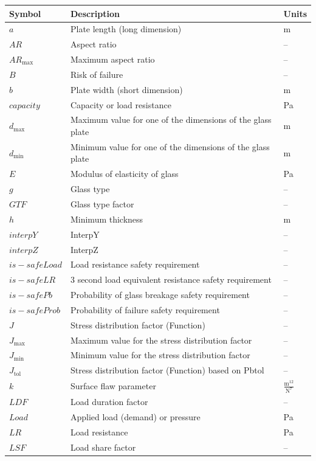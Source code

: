 \documentclass[12pt]{article}
\begin{document}
\begin{longtabu}{l X[l] l}
\toprule
\textbf{Symbol} & \textbf{Description} & \textbf{Units}
\\
\midrule
\endhead
$a$ & Plate length (long dimension) & m
\\
$AR$ & Aspect ratio & --
\\
${AR_{\text{max}}}$ & Maximum aspect ratio & --
\\
$B$ & Risk of failure & --
\\
$b$ & Plate width (short dimension) & m
\\
$capacity$ & Capacity or load resistance & Pa
\\
${d_{\text{max}}}$ & Maximum value for one of the dimensions of the glass plate & m
\\
${d_{\text{min}}}$ & Minimum value for one of the dimensions of the glass plate & m
\\
$E$ & Modulus of elasticity of glass & Pa
\\
$g$ & Glass type & --
\\
$GTF$ & Glass type factor & --
\\
$h$ & Minimum thickness & m
\\
$interpY$ & InterpY & --
\\
$interpZ$ & InterpZ & --
\\
$is-safeLoad$ & Load resistance safety requirement & --
\\
$is-safeLR$ & 3 second load equivalent resistance safety requirement & --
\\
$is-safePb$ & Probability of glass breakage safety requirement & --
\\
$is-safeProb$ & Probability of failure safety requirement & --
\\
$J$ & Stress distribution factor (Function) & --
\\
${J_{\text{max}}}$ & Maximum value for the stress distribution factor & --
\\
${J_{\text{min}}}$ & Minimum value for the stress distribution factor & --
\\
${J_{\text{tol}}}$ & Stress distribution factor (Function) based on Pbtol & --
\\
$k$ & Surface flaw parameter & $\frac{\text{m}^{12}}{\text{N}^{7}}$
\\
$LDF$ & Load duration factor & --
\\
$Load$ & Applied load (demand) or pressure & Pa
\\
$LR$ & Load resistance & Pa
\\
$LSF$ & Load share factor & --

\end{longtabu}
\end{document}
